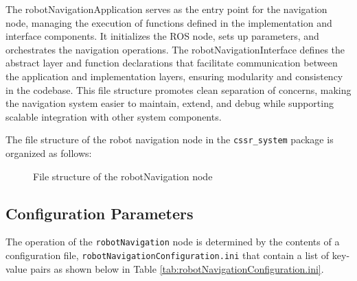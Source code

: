 \documentclass{CSSRforAfrica}
\renewcommand{\DTstyle}{\footnotesize\sffamily}
\begin{document}
\noindent The robotNavigationApplication serves as the entry point for the navigation node, managing the execution of functions defined in the implementation and interface components. It initializes the ROS node, sets up parameters, and orchestrates the navigation operations. The robotNavigationInterface defines the abstract layer and function declarations that facilitate communication between the application and implementation layers, ensuring modularity and consistency in the codebase. This file structure promotes clean separation of concerns, making the navigation system easier to maintain, extend, and debug while supporting scalable integration with other system components.

\noindent The file structure of the robot navigation node in the \verb|cssr_system| package is organized as follows:

\vspace*{0.5em}
\begin{figure}[H]
	\renewcommand*\DTstyle{\ttfamily}
	\caption{File structure of the robotNavigation node}
	\label{fig:navigation_file_structure}
\end{figure}

\subsection{Configuration Parameters}
The operation of the \verb|robotNavigation| node is determined by the contents of a configuration file, \verb|robotNavigationConfiguration.ini| that contain a list of key-value pairs as shown below in Table \ref{tab:robotNavigationConfiguration.ini}.
\end{document}
